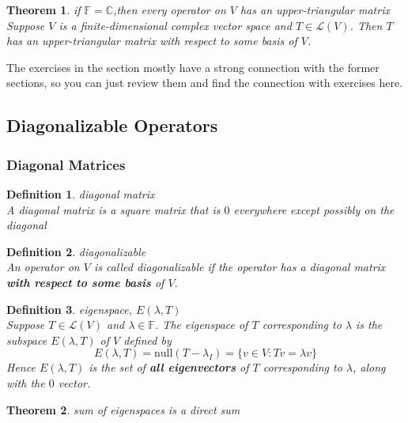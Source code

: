 \documentclass{article}
\newtheorem{theorem}{Theorem}[subsection]
\newtheorem{definition}{Definition}[subsection]
\newcommand{\CC}{\mathbb{C}}
\newcommand{\FF}{\mathbb{F}}
\newcommand{\n}{\text{null}}
\begin{document}
\begin{CJK}{UTF8}{gkai}
\begin{theorem}
    if $\FF = \CC$,then every operator on $V$ has an upper-triangular matrix\\

    Suppose $V$ is a finite-dimensional complex vector space and $T \in \mathcal{L}(V)$. Then
    $T$ has an upper-triangular matrix with respect to some basis of $V$.
\end{theorem}

The exercises in the section mostly have a strong connection with the former sections, so you can just review them and find the connection with exercises here.

\subsection{Diagonalizable Operators}

\subsubsection{Diagonal Matrices}

\begin{definition}
    diagonal matrix\\

    A diagonal matrix is a square matrix that is $0$ everywhere except possibly on the diagonal
\end{definition}

\begin{definition}
    diagonalizable\\

    An operator on $V$ is called diagonalizable if the operator has a diagonal matrix \textbf{with respect to some basis} of $V$.
\end{definition}

\begin{definition}
    eigenspace, $E (\lambda,T)$\\

    Suppose $T \in \mathcal{L}(V)$ and $\lambda \in \FF$. The eigenspace of $T$ corresponding to $\lambda$ is the subspace $E (\lambda,T)$ of $V$ defined by
    \[E (\lambda,T) = \n(T - \lambda_I) = \{v \in V : Tv = \lambda v\}\]
    Hence $E (\lambda,T)$ is the set of \textbf{all eigenvectors} of $T$ corresponding to $\lambda$, along with the $0$ vector.
\end{definition}

\begin{theorem}
    sum of eigenspaces is a direct sum\\


\end{theorem}
\end{CJK}
\end{document}
